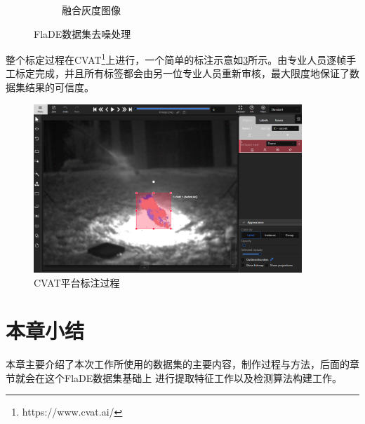 \begin{figure}[ht]
\begin{subfigure}{0.49\textwidth}
        \caption{融合灰度图像}
        \label{subfig:FlaDE_project_02}
    \end{subfigure}
    \caption{FlaDE数据集去噪处理}
\end{figure}

整个标定过程在CVAT\footnote{https://www.cvat.ai/}上进行，一个简单的标注示意如\ref{fig:annotation}所示。由专业人员逐帧手工标定完成，并且所有标签都会由另一位专业人员重新审核，最大限度地保证了数据集结果的可信度。

\begin{figure}
    \centering
    \includegraphics[width=0.9\textwidth]{figures/annotation.png}
    \caption{CVAT平台标注过程}
    \label{fig:annotation}
\end{figure}

\section{本章小结}
本章主要介绍了本次工作所使用的数据集的主要内容，制作过程与方法，后面的章节就会在这个FlaDE数据集基础上
进行提取特征工作以及检测算法构建工作。